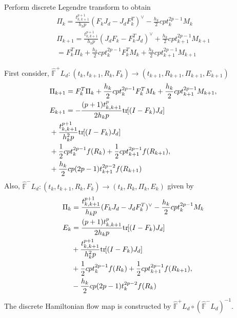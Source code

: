 \documentclass[letterpaper, 10pt, conference]{ieeeconf}
\newcommand{\bracket}[1]{\ensuremath{\left[ #1 \right]}}
\newcommand{\tr}[1]{\mbox{tr}\ensuremath{\negthickspace\bracket{#1}}}
\begin{document}
Perform discrete Legendre transform to obtain
\begin{gather*}
    \Pi_k =\frac{t_{k,k+1}^{p+1} }{h_k p} (F_k J_d - J_dF_k^T)^\vee  -\frac{h_k}{2} cp t_k^{2p-1} M_k \\
    \Pi_{k+1} = \frac{t_{k,k+1}^{p+1} }{h_k p} (J_dF_k -F_k^T J_d)^\vee + \frac{h_k}{2} cpt^{2p-1}_{k+1} M_{k+1}\\
= F_k^T \Pi_k + \frac{h_k}{2} cp t_k^{2p-1} F_k^T M_k +\frac{h_k}{2} cpt^{2p-1}_{k+1} M_{k+1}
\end{gather*}

First consider, $\hat{\mathbb{F}}^+ L_d: (t_k,t_{k+1},R_k,F_k)\rightarrow(t_{k+1}, R_{k+1}, \Pi_{k+1}, E_{k+1})$
\begin{align*}
&    \Pi_{k+1}  = F_k^T \Pi_k + \frac{h_k}{2} cp t_k^{2p-1} F_k^T M_k +\frac{h_k}{2} cpt^{2p-1}_{k+1} M_{k+1},\\
& E_{k+1} = - \frac{(p+1)t_{k,k+1}^p}{2 h_k p} \tr{(I-F_k)J_d}  \\
&     +\frac{t^{p+1}_{k,k+1}}{h_k^2 p} \tr{(I-F_k)J_d}\\
    & + \frac{1}{2}c p t_k^{2p-1} f(R_k) + \frac{1}{2}c p t_{k+1}^{2p-1} f(R_{k+1}),\\
    & +\frac{h_k}{2} c p (2p-1) t_{k+1}^{2p-2} f(R_{k+1}) \\
\end{align*}
Also, $\hat{\mathbb{F}}^- L_d: (t_k,t_{k+1}, R_k, F_k)\rightarrow (t_k, R_k, \Pi_k, E_k)$ given by
\begin{align*}
    \Pi_k & =\frac{t_{k,k+1}^{p+1}}{h_k p} (F_k J_d - J_dF_k^T)^\vee  -\frac{h_k}{2} cp t_k^{2p-1} M_k \\
    E_k & = \frac{(p+1)t_{k,k+1}^p}{ 2 h_k p} \tr{(I-F_k)J_d}  \\
    & +\frac{t^{p+1}_{k,k+1}}{h_k^2 p} \tr{(I-F_k)J_d}\\
    & + \frac{1}{2}c p t_k^{2p-1} f(R_k) + \frac{1}{2}c p t_{k+1}^{2p-1} f(R_{k+1}),\\
    & -\frac{h_k}{2} c p (2p-1) t_k^{2p-2} f(R_k) \\
\end{align*}
The discrete Hamiltonian flow map is constructed by $\hat{\mathbb{F}}^+L_d \circ (\hat{\mathbb{F}}^-L_d)^{-1}$.




\end{document}
